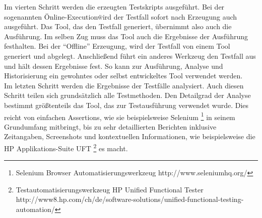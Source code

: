 Im vierten Schritt werden die erzeugten Testskripts ausgeführt. Bei der sogenannten \"Online-Execution\" wird der Testfall sofort nach Erzeugung auch ausgeführt. Das Tool, das den Testfall generiert, übernimmt also auch die Ausführung. Im selben Zug muss das Tool auch die Ergebnisse der Ausführung festhalten. Bei der ``Offline'' Erzeugung, wird der Testfall von einem Tool generiert und abgelegt. Anschließend führt ein anderes Werkzeug den Testfall aus und hält dessen Ergebnisse fest. So kann zur Ausführung, Analyse und Historisierung ein gewohntes oder selbst entwickeltes Tool verwendet werden.\\
Im letzten Schritt werden die Ergebnisse der Testfälle analysiert. Auch diesen Schritt teilen sich grundsätzlich alle Testmethoden. Den Detailgrad der Analyse bestimmt größtenteils das Tool, das zur Testausführung verwendet wurde. Dies reicht von einfachen Assertions, wie sie beispielsweise Selenium \footnote{Selenium Browser Automatisierungswerkzeug http://www.seleniumhq.org/} in seinem Grundumfang mitbringt, bis zu sehr detaillierten Berichten inklusive Zeitangaben, Screenshots und kontextuellen Informationen, wie beispielsweise die HP Applikations-Suite UFT \footnote{Testautomatisierungswerkzeug HP Unified Functional Tester http://www8.hp.com/ch/de/software-solutions/unified-functional-testing-automation/} es macht.

